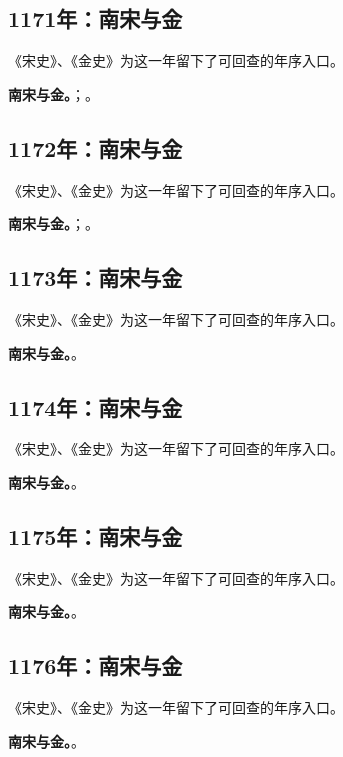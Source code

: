 \subsection{1171年：南宋与金}
《宋史》、《金史》为这一年留下了可回查的年序入口。

\noindent\textbf{南宋与金。}；。

\subsection{1172年：南宋与金}
《宋史》、《金史》为这一年留下了可回查的年序入口。

\noindent\textbf{南宋与金。}；。

\subsection{1173年：南宋与金}
《宋史》、《金史》为这一年留下了可回查的年序入口。

\noindent\textbf{南宋与金。}。

\subsection{1174年：南宋与金}
《宋史》、《金史》为这一年留下了可回查的年序入口。

\noindent\textbf{南宋与金。}。

\subsection{1175年：南宋与金}
《宋史》、《金史》为这一年留下了可回查的年序入口。

\noindent\textbf{南宋与金。}。

\subsection{1176年：南宋与金}
《宋史》、《金史》为这一年留下了可回查的年序入口。

\noindent\textbf{南宋与金。}。

